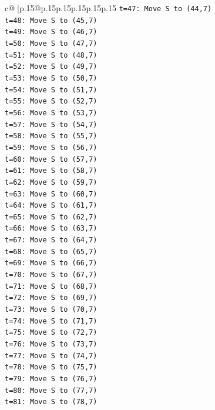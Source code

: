 \documentclass{article}
\begin{document}
{\begin{supertabular}{c@{$\;$}|p{.15\linewidth}@{}p{.15\linewidth}p{.15\linewidth}p{.15\linewidth}p{.15\linewidth}p{.15\linewidth}}
{{{\texttt{t=47: Move S to (44,7)} \\
\texttt{t=48: Move S to (45,7)} \\
\texttt{t=49: Move S to (46,7)} \\
\texttt{t=50: Move S to (47,7)} \\
\texttt{t=51: Move S to (48,7)} \\
\texttt{t=52: Move S to (49,7)} \\
\texttt{t=53: Move S to (50,7)} \\
\texttt{t=54: Move S to (51,7)} \\
\texttt{t=55: Move S to (52,7)} \\
\texttt{t=56: Move S to (53,7)} \\
\texttt{t=57: Move S to (54,7)} \\
\texttt{t=58: Move S to (55,7)} \\
\texttt{t=59: Move S to (56,7)} \\
\texttt{t=60: Move S to (57,7)} \\
\texttt{t=61: Move S to (58,7)} \\
\texttt{t=62: Move S to (59,7)} \\
\texttt{t=63: Move S to (60,7)} \\
\texttt{t=64: Move S to (61,7)} \\
\texttt{t=65: Move S to (62,7)} \\
\texttt{t=66: Move S to (63,7)} \\
\texttt{t=67: Move S to (64,7)} \\
\texttt{t=68: Move S to (65,7)} \\
\texttt{t=69: Move S to (66,7)} \\
\texttt{t=70: Move S to (67,7)} \\
\texttt{t=71: Move S to (68,7)} \\
\texttt{t=72: Move S to (69,7)} \\
\texttt{t=73: Move S to (70,7)} \\
\texttt{t=74: Move S to (71,7)} \\
\texttt{t=75: Move S to (72,7)} \\
\texttt{t=76: Move S to (73,7)} \\
\texttt{t=77: Move S to (74,7)} \\
\texttt{t=78: Move S to (75,7)} \\
\texttt{t=79: Move S to (76,7)} \\
\texttt{t=80: Move S to (77,7)} \\
\texttt{t=81: Move S to (78,7)} \\
}}}
\end{supertabular}}
\end{document}
